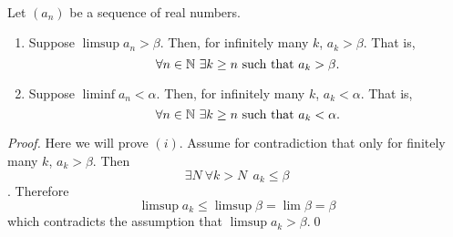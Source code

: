 \begin{theorem} \leavevmode \\
    Let $(a_n)$ be a sequence of real numbers.
    \begin{enumerate}[$(i)$]
        \item Suppose $\limsup a_n > \beta$. Then, for infinitely many $k$, $a_k > \beta$. That is,
        $$\forall n \in \mathbb{N} ~\exists k \geq n \text{ such that } a_k > \beta.$$
        \item Suppose $\liminf a_n < \alpha$. Then, for infinitely many $k$, $a_k < \alpha$. That is,
        $$\forall n \in \mathbb{N} ~\exists k \geq n \text{ such that } a_k < \alpha.$$
    \end{enumerate}
\end{theorem}

\begin{proof}
    Here we will prove $(i)$. Assume for contradiction that only for finitely many $k$, $a_k > \beta$. Then
    $$\exists N ~\forall k> N ~~a_k \leq \beta$$.
    Therefore
    $$\limsup a_k \leq \limsup \beta = \lim \beta = \beta$$
    which contradicts the assumption that $\limsup a_k > \beta.$\qed
\end{proof}


